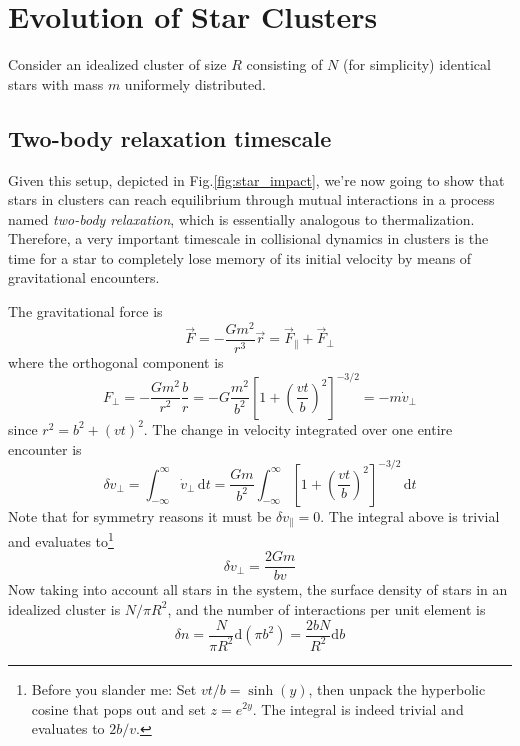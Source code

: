 \section{Evolution of Star Clusters}
Consider an idealized cluster of size $R$ consisting of $N$ (for simplicity) identical stars with mass $m$ uniformely distributed.

\subsection{Two-body relaxation timescale}
Given this setup, depicted in Fig.\ref{fig:star_impact}, we're now going to show that stars in clusters can reach equilibrium through mutual interactions in a process named \emph{two-body relaxation}, which is essentially analogous to thermalization. Therefore, a very important timescale in collisional dynamics in clusters is the time for a star to completely lose memory of its initial velocity by means of gravitational encounters.
\par The gravitational force is 
\begin{equation*}
    \vec{F} = -\frac{Gm^{2}}{r^{3}}\vec{r} = \vec{F}_{\parallel}+\vec{F}_{\perp}
\end{equation*}
where the orthogonal component is
\begin{equation*}
    F_{\perp} = -\frac{Gm^{2}}{r^{2}}\frac{b}{r} = -G\frac{m^{2}}{b^{2}}\left[1+\left(\frac{vt}{b}\right)^{2}\right]^{-3/2} = -m\dot{v}_{\perp}
\end{equation*}
since $r^{2} = b^{2}+(vt)^{2}$. The change in velocity integrated over one entire encounter is 
\begin{equation*}
    \delta v_{\perp} = \int_{-\infty}^{\infty}\dot{v}_{\perp}\,\text{d}t = \frac{Gm}{b^{2}}\int_{-\infty}^{\infty}\left[1+\left(\frac{vt}{b}\right)^{2}\right]^{-3/2}\,\text{d}t
\end{equation*}
Note that for symmetry reasons it must be $\delta v_{\parallel} = 0$. The integral above is trivial and evaluates to\footnote{Before you slander me: Set $vt/b = \sinh(y)$, then unpack the hyperbolic cosine that pops out and set $z = e^{2y}$. The integral is indeed trivial and evaluates to $2b/v$.}
\begin{equation*}
     \delta v_{\perp} = \frac{2Gm}{bv}
\end{equation*}
Now taking into account all stars in the system, the surface density of stars in an idealized cluster is $N/\pi R^{2}$, and the number of interactions per unit element is 
\begin{equation*}
    \delta n = \frac{N}{\pi R^{2}}\text{d}(\pi b^{2}) = \frac{2bN}{R^{2}}\text{d}b
\end{equation*}

